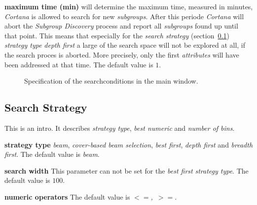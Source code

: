 \documentclass{article}
\begin{document}
\textbf{maximum time (min)} will determine the maximum time, measured in minutes, \emph{Cortana} is allowed to search for new \emph{subgroups}.
After this periode \emph{Cortana} will abort the \emph{Subgroup Discovery} process and report all \emph{subgroups} found up until that point.
This means that especially for the \emph{search strategy} (section~\ref{main:search-strategy}) \emph{strategy type} \emph{depth first} a large of the search space will not be explored at all, if the search proces is aborted.
More precisely, only the first \emph{attributes} will have been addressed at that time.
The default value is $1$.

\begin{figure}
\begin{center}
\centering
{}
\caption{Specification of the searchconditions in the main window.}
\end{center}
\label{fig:searchconditions}
\end{figure}



\subsection{Search Strategy}
\label{main:search-strategy}
This is an intro.
It describes \emph{strategy type}, \emph{best numeric} and \emph{number of bins}.

\textbf{strategy type} \emph{beam}, \emph{cover-based beam selection}, \emph{best first}, \emph{depth first} and \emph{breadth first}.
The default value is \emph{beam}.

\textbf{search width} This parameter can not be set for the \emph{best first} \emph{strategy type}.
The default value is \emph{$100$}.

\textbf{numeric operators} The default value is \mbox{\emph{$<=$, $>=$}}.
\end{document}
